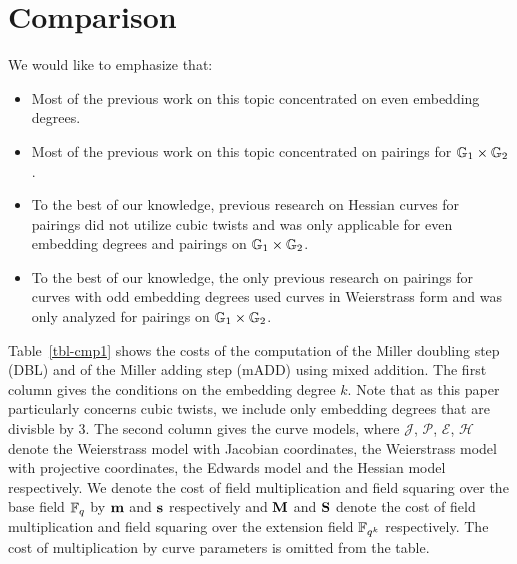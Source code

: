 \section{Comparison}
\label{sec:cmp}

We would like to emphasize that:
\begin{itemize}
\item	Most of the previous work on this topic concentrated on even embedding degrees.
\item   Most of the previous work on this topic concentrated on pairings for $\mathbb{G}_{1} \times \mathbb{G}_{2}$.
\item   To the best of our knowledge, previous research on Hessian curves for pairings did not utilize cubic twists and was only applicable for even embedding degrees and pairings on $\mathbb{G}_{1} \times \mathbb{G}_{2}$.
\item   To the best of our knowledge, the only previous research on pairings for curves with odd embedding degrees used curves in Weierstrass form and was only analyzed for pairings on $\mathbb{G}_{1} \times \mathbb{G}_{2}$.
\end{itemize}

Table~\ref{tbl-cmp1} shows the costs of the computation of the Miller doubling step (DBL) and of the Miller adding step (mADD) using mixed addition.
The first column gives the conditions on the embedding degree $k$.
Note that as this paper particularly concerns cubic twists, we include only embedding degrees that are divisble by 3.
The second column gives the curve models, where 
$\mathcal{J}$, $\mathcal{P}$, $\mathcal{E}$, $\mathcal{H}$ denote the
Weierstrass model with Jacobian coordinates, the
Weierstrass model with projective coordinates,
the Edwards model and the
Hessian model respectively.
We denote the cost of field multiplication and field squaring over the base field $\mathbb{F}_{q}$ by $\textbf{m}$ and $\textbf{s}$ respectively and $\textbf{M}$ and $\textbf{S}$ denote the cost of field multiplication and field squaring over the extension field $\mathbb{F}_{q^k}$ respectively.
The cost of multiplication by curve parameters is omitted from the table.

